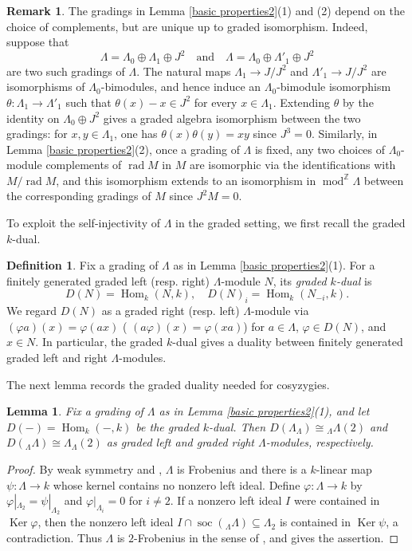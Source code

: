 \documentclass{amsart}
\newtheorem{lem}[thm]{Lemma}
\theoremstyle{definition}
\newtheorem{dfn}[thm]{Definition}
\newtheorem{rem}[thm]{Remark}
\theoremstyle{remark}
\numberwithin{equation}{thm}
\def\gmod{\operatorname{mod}^{\mathbb{Z}}\!}
\def\Hom{\operatorname{Hom}}
\def\ker{\operatorname{Ker}}
\def\L{\Lambda}
\def\rad{\operatorname{rad}}
\def\soc{\operatorname{soc}}
\begin{document}
\begin{rem}\label{unique grading}
The gradings in Lemma \ref{basic properties2}(1) and (2) depend on the choice of complements, but are unique up to graded isomorphism. Indeed, suppose that
$$
\L=\L_0\oplus\L_1\oplus J^2 \quad\text{and}\quad \L=\L_0\oplus\L'_1\oplus J^2
$$
are two such gradings of $\L$. 
The natural maps $\L_1\to J/J^2$ and $\L'_1\to J/J^2$ are isomorphisms of $\L_0$-bimodules, and hence induce an $\L_0$-bimodule isomorphism $\theta:\L_1\to\L'_1$ such that $\theta(x)-x\in J^2$ for every $x\in\L_1$.  Extending $\theta$ by the identity on $\L_0\oplus J^2$ gives a graded algebra isomorphism between the two gradings: for $x,y\in\L_1$, one has $\theta(x)\theta(y)=xy$ since $J^3=0$.
Similarly, in Lemma \ref{basic properties2}(2), once a grading of $\L$ is fixed, any two choices of $\L_0$-module complements of $\rad M$ in $M$ are isomorphic via the identifications with $M/\rad M$, and this isomorphism extends to an isomorphism in $\gmod\L$ between the corresponding gradings of $M$ since $J^2M=0$.
\end{rem}

To exploit the self-injectivity of $\L$ in the graded setting, we first recall the graded $k$-dual.

\begin{dfn}
Fix a grading of $\L$ as in Lemma \ref{basic properties2}(1).
For a finitely generated graded left (resp.\! right) $\L$-module $N$, its \textit{graded $k$-dual} is
$$
D(N)=\Hom_k(N,k),
\quad
D(N)_i=\Hom_k(N_{-i},k).
$$
We regard $D(N)$ as a graded right (resp.\! left) $\L$-module via $(\varphi a)(x)=\varphi(ax)$ ( $(a\varphi)(x)=\varphi(xa)$) for $a\in\L$, $\varphi\in D(N)$, and $x\in N$. 
In particular, the graded $k$-dual gives a duality between finitely generated graded left and right $\L$-modules.
\end{dfn}

The next lemma records the graded duality needed for cosyzygies.

\begin{lem}\label{Matlis duality}
Fix a grading of $\L$ as in Lemma \ref{basic properties2}(1), and let $D(-)=\Hom_k(-,k)$ be the graded $k$-dual. Then $D(\L_\L)\cong {}_\L\L(2)$ and $D({}_\L\L)\cong \L_\L(2)$ as graded left and graded right $\L$-modules, respectively.
\end{lem}

\begin{proof}
By weak symmetry and \cite[(3.15) and the discussion following Corollary 16.64]{Lam2}, $\L$ is Frobenius and there is a $k$-linear map $\psi:\L\to k$ whose kernel contains no nonzero left ideal. 
Define $\varphi:\L\to k$ by $\varphi|_{\L_2}=\psi|_{\L_2}$ and
$\varphi|_{\L_i}=0$ for $i\ne2$.
If a nonzero left ideal $I$ were contained in $\ker\varphi$, then the nonzero  left ideal $I\cap\soc({}_\L\L)\subseteq\L_2$ is contained in $\ker\psi$, a contradiction.
Thus $\L$ is $2$-Frobenius in the sense of \cite[Definition 5.3]{BT}, and \cite[Lemma 5.5]{BT} gives the assertion. 
\end{proof}
\end{document}
